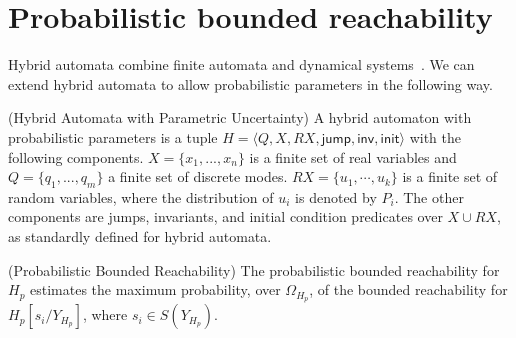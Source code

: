 \section{Probabilistic bounded reachability}

Hybrid automata combine finite automata and dynamical systems~\cite{henzinger2000theory}. We can extend hybrid automata to allow probabilistic parameters in the following way. 

\begin{definition}
\label{def:ha}
{\rm(Hybrid Automata with Parametric Uncertainty)} A hybrid automaton with probabilistic parameters is a tuple $H = \langle Q,X,RX,\mathsf{jump},\mathsf{inv},\mathsf{init}\rangle$
with the following components. $X = \{x_1,...,x_n\}$ is a finite set of real variables and $Q=\{q_1,...,q_m\}$ a finite set of discrete modes. $RX = \{ u_1, \cdots, u_k \}$ is a finite set of random variables, where the distribution of $u_i$ is denoted by $P_i$. The other components are jumps, invariants, and initial condition predicates over $X\cup RX$, as standardly defined for hybrid automata.
\end{definition}

\begin{definition}
\label{def:pbr}
{\rm (Probabilistic Bounded Reachability)}
The probabilistic bounded reachability for $H_p$ estimates the maximum probability, over $\Omega_{H_p}$, of the bounded reachability for $H_{p}[s_i/Y_{H_p}]$, where $s_i \in S(Y_{H_p})$.
\end{definition}

